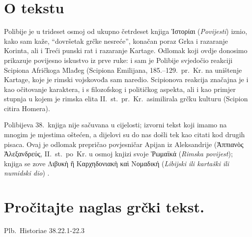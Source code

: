 

\section*{O tekstu}

Polibije je u trideset osmoj od ukupno četrdeset knjiga \textgreek[variant=ancient]{Ἱστορίαι} (\textit{Povijesti}) iznio, kako sam kaže, ``dovršetak grčke nesreće'', konačan poraz Grka i razaranje Korinta, ali i Treći punski rat i razaranje Kartage. Odlomak koji ovdje donosimo prikazuje povijesno iskustvo iz prve ruke: i sam je Polibije svjedočio reakciji Scipiona Afričkoga Mlađeg (Scipiona Emilijana, 185.–129.\ pr.~Kr. na uništenje Kartage, koje je rimski vojskovođa sam naredio. Scipionova reakcija značajna je i kao očitovanje karaktera, i s filozofskog i političkog aspekta, ali i kao primjer stupnja u kojem je rimska elita II.~st.\ pr.~Kr.\ asimilirala grčku kulturu (Scipion citira Homera).

Polibijeva 38.\ knjiga nije sačuvana u cijelosti; izvorni tekst koji imamo na mnogim je mjestima oštećen, a dijelovi su do nas došli tek kao citati kod drugih pisaca. Ovaj je odlomak prepričao povjesničar Apijan iz Aleksandrije \textgreek[variant=ancient]{(Ἀππιανὸς Ἀλεξανδρεύς,} II.~st.\ po~Kr. u osmoj knjizi svoje \textgreek[variant=ancient]{Ῥωμαϊκά} (\textit{Rimska povijest}); knjiga se zove \textgreek[variant=ancient]{Λιβυκὴ ἢ Καρχηδονιακὴ καὶ Νομαδική} (\textit{Libijski ili kartaški ili numidski dio}) .


\section*{Pročitajte naglas grčki tekst.}

Plb.\ Historiae 38.22.1-22.3


\medskip


